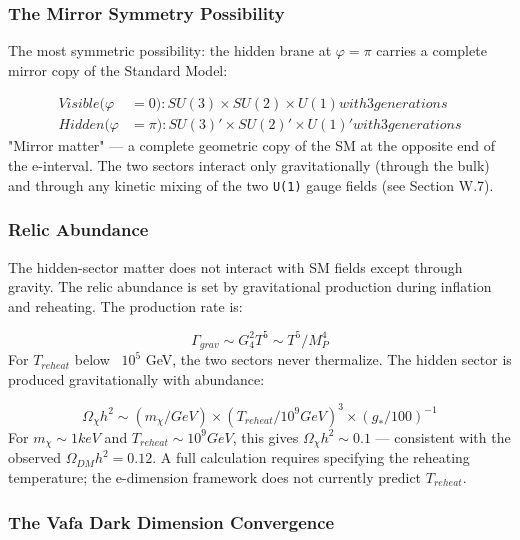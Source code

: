 \documentclass[aps,prd,preprint,superscriptaddress,longbibliography,floatfix]{revtex4-2}
\theoremstyle{remark}
\begin{document}
\subsubsection{The Mirror Symmetry Possibility}

The most symmetric possibility: the hidden brane at $\varphi = \pi$ carries a complete mirror copy of the Standard Model:


\begin{align}
    Visible (\varphi &= 0):  SU(3) \times SU(2) \times U(1) with 3 generations \\
    Hidden  (\varphi &= \pi):  SU(3)'\times SU(2)'\times U(1)'with 3 generations
\end{align}
"Mirror matter" --- a complete geometric copy of the SM at the opposite end of the e-interval. The two sectors interact only gravitationally (through the bulk) and through any kinetic mixing of the two \texttt{U(1)} gauge fields (see Section W.7).


\subsubsection{Relic Abundance}

The hidden-sector matter does not interact with SM fields except through gravity. The relic abundance is set by gravitational production during inflation and reheating. The production rate is:


\begin{equation}
    \Gamma_{grav} \sim  G_{4}^{2} T^{5} \sim  T^{5}/M_P^{4}
\end{equation}
For $T_{reheat}$ below ~$10^{5}$ GeV, the two sectors never thermalize. The hidden sector is produced gravitationally with abundance:


\begin{equation}
    \Omega_\chi h^{2} \sim  (m_\chi/GeV) \times (T_{reheat}/10^{9} GeV)^{3} \times (g_*/100)^{-1}
\end{equation}
For $m_\chi \sim  1 keV$ and $T_{reheat} \sim  10^{9} GeV$, this gives $\Omega_\chi h^{2} \sim  0.1$ --- consistent with the observed $\Omega_{DM} h^{2} = 0.12$. A full calculation requires specifying the reheating temperature; the e-dimension framework does not currently predict $T_{reheat}$.


\subsubsection{The Vafa Dark Dimension Convergence}
\end{document}
